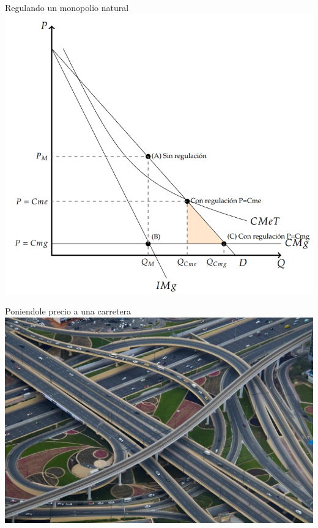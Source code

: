 \documentclass{beamer}
\begin{document}
\begin{frame}{Regulando un monopolio natural}
    \centering
    \includegraphics[scale=0.55]{../Figures/C24.12.png}
\end{frame}

\begin{frame}{Poniendole precio a una carretera}
    \centering
    \includegraphics[scale=0.25]{../Figures/C24.13.jpg}
\end{frame}
\end{document}
